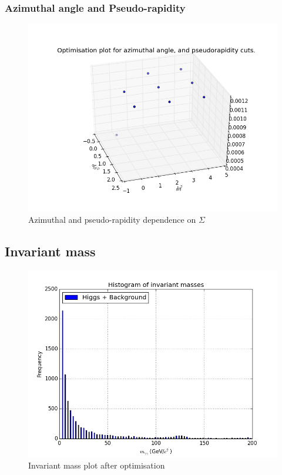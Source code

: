 \documentclass{article}
\begin{document}
\subsubsection{Azimuthal angle and Pseudo-rapidity}
\begin{figure}
\includegraphics[scale=0.5]{etaphi1}
\caption{Azimuthal and pseudo-rapidity dependence on $\Sigma$}
\end{figure}
\subsection{Invariant mass}
\begin{figure}
\includegraphics[scale=0.5]{invariantmass1}
\caption{Invariant mass plot after optimisation}
\end{figure}
\end{document}
